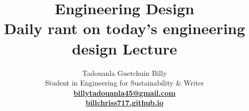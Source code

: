 \documentclass[11pt, a4paper]{article}
\title{
  {\bfseries\color{navyblue} Engineering Design}\\
  \large Daily rant on today's engineering design Lecture
}
\author{
  Tadouanla Guetchuin Billy \\ 
  {\small Student in Engineering for Sustainability \& Writer}\\[0.3em]
  {\small\rmfamily\bfseries
    \href{mailto:billytadouanla45@gmail.com}
    {billytadouanla45@gmail.com}
  }\\[0.3em]
  {\small\rmfamily\bfseries
    \href{https://billchriss717.github.io/}
    {billchriss717.github.io}
  }
}
\begin{document}
\maketitle
{}
\setcounter{page}{1}

\begin{abstract}

\end{abstract}

\tableofcontents
\newpage
{}
\setcounter{page}{1}

\end{document}
